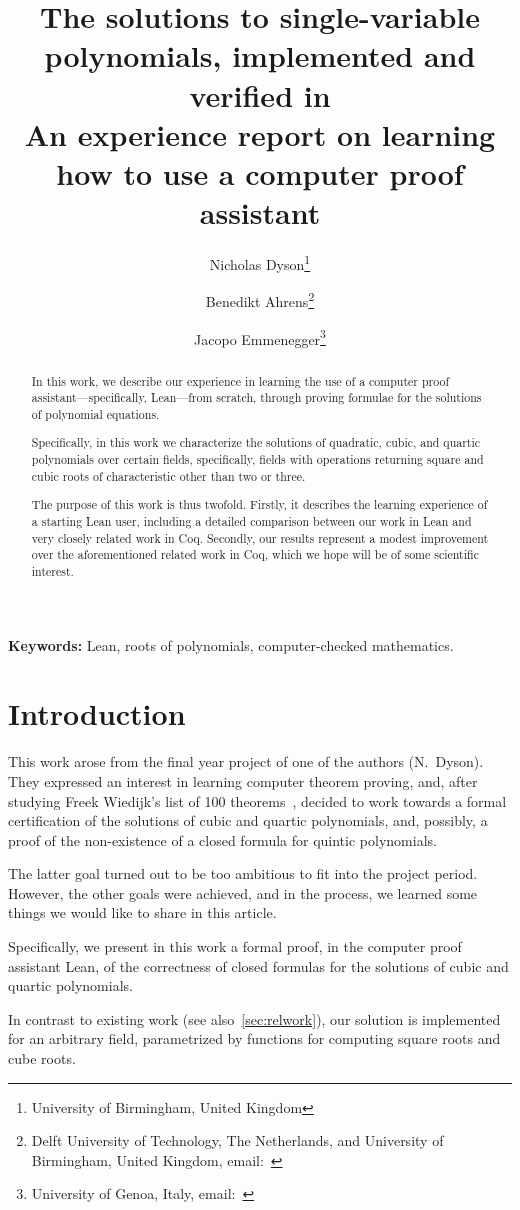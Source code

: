 \documentclass{article} %
\title{The solutions to single-variable polynomials, implemented and verified in \Lean\\
{\normalsize An experience report on learning how to use a computer proof assistant}
}
\author{%
Nicholas Dyson\thanks{%
University of Birmingham, United Kingdom}
\and
Benedikt Ahrens\thanks{%
Delft University of Technology, The Netherlands, and University of Birmingham, United Kingdom,
email:~\email{B.P.Ahrens@tudelft.nl}}
\and
Jacopo Emmenegger\thanks{
University of Genoa, Italy,
email:~\email{emmenegger@dima.unige.it}}
}
\date{}
\theoremstyle{plain}
\theoremstyle{definition}
\newcommand{\Lean}{\textsf{Lean}\xspace}
\begin{document}
\maketitle


\begin{abstract}
 In this work, we describe our experience in learning the use of a computer proof assistant---specifically, \Lean---from scratch,
 through proving formulae for the solutions of polynomial equations.
 
 Specifically, in this work we characterize the solutions of quadratic, cubic, and quartic polynomials over certain fields, specifically,
 fields with operations returning square and cubic roots of characteristic other than two or three.
 
 The purpose of this work is thus twofold.
 Firstly, it describes the learning experience of a starting \Lean user, including a detailed comparison between our work in \Lean and very closely related work in Coq.
 Secondly, our results represent a modest improvement over the aforementioned related work in Coq, which we hope will be of some scientific interest.
\end{abstract}

\bigskip\noindent
\textbf{Keywords:} Lean, roots of polynomials, computer-checked mathematics.


\section{Introduction}
\label{sec:intro}

This work arose from the final year project of one of the authors (N.~Dyson).
They expressed an interest in learning computer theorem proving, and, after studying Freek Wiedijk's list of 100 theorems~\cite{100_theorems}, decided to work towards a formal certification of the solutions of cubic and quartic polynomials, and, possibly, a proof of the non-existence of a closed formula for quintic polynomials.

The latter goal turned out to be too ambitious to fit into the project period. 
However, the other goals were achieved, and in the process, we learned some things we would like to share in this article.

Specifically, we present in this work a formal proof, in the computer proof assistant \Lean, of the correctness of closed formulas for the solutions of cubic and quartic polynomials.

In contrast to existing work (see also~\cref{sec:relwork}), our solution is implemented for an arbitrary field, parametrized by functions for computing square roots and cube roots.
\end{document}
